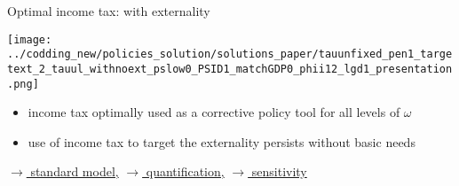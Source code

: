 \documentclass[11pt,aspectratio=169]{beamer}
\begin{document}
	
	\addtocounter{framenumber}{-1}
	\begin{frame}{Optimal income tax: with externality}
		
		\begin{center}
			\begin{minipage}[]{0.45\textwidth}
				\texttt{[image: ../codding\_new/policies\_solution/solutions\_paper/tauunfixed\_pen1\_targetext\_2\_tauul\_withnoext\_pslow0\_PSID1\_matchGDP0\_phii12\_lgd1\_presentation.png]}
			\end{minipage}
		\end{center}
		\vspace{2mm}
		\begin{itemize}
			\item<1-> income tax optimally used as a corrective policy tool for all levels of $\omega$
			\vspace{2mm}
			\item<1-> use of income tax to target the externality persists without basic needs %
		\end{itemize}
		\vspace{-2mm}
		\hfill
		\hyperlink{noBN}{\tiny{$\rightarrow$ standard model,}} 
		\hyperlink{3exp}{\tiny{$\rightarrow$ quantification,}} 
		\hyperlink{sensi}{\tiny{$\rightarrow$ sensitivity}}
		\hypertarget{backpe}{}
	\end{frame}
	
	
	
\end{document}
